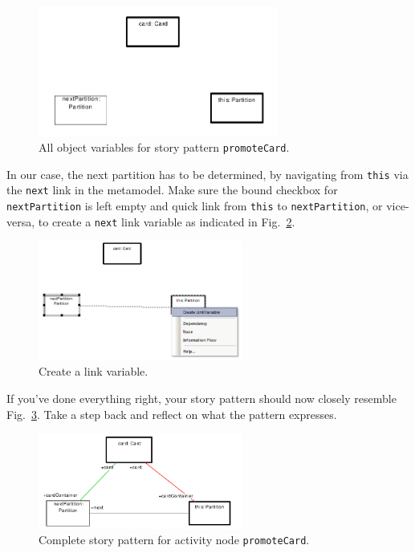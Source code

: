 \begin{figure}[htbp]
\begin{center}
  \includegraphics[width=0.7\textwidth]{pics/sdmBilder/check/sdm25.pdf}
  \caption{All object variables for story pattern \texttt{promoteCard}.}  
  \label{fig:sdm_check_complete_sp}
\end{center}
\end{figure} 

In our case, the next partition has to be determined, by navigating from
\texttt{this} via the \texttt{next} link in the metamodel.  Make sure the bound
checkbox for \texttt{nextPartition} is left empty and quick link from
\texttt{this} to \texttt{nextPartition}, or vice-versa, to create a
\texttt{next} link variable as indicated in
Fig.~\ref{fig:sdm_check_link_variable}. 

\begin{figure}[htbp]
\begin{center}
  \includegraphics[width=0.6\textwidth]{pics/sdmBilder/check/sdm26}
  \caption{Create a link variable.}  
  \label{fig:sdm_check_link_variable}
\end{center}
\end{figure}

If you've done everything right, your story pattern should now closely resemble
Fig.~\ref{fig:sdm_check_complete_activity_node}.  Take a step back and reflect
on what the pattern expresses.

\begin{figure}[htbp] 
\begin{center}
  \includegraphics[width=0.6\textwidth]{pics/sdmBilder/check/sdm30}
  \caption{Complete story pattern for activity node \texttt{promoteCard}.}  
  \label{fig:sdm_check_complete_activity_node}
\end{center}
\end{figure}

